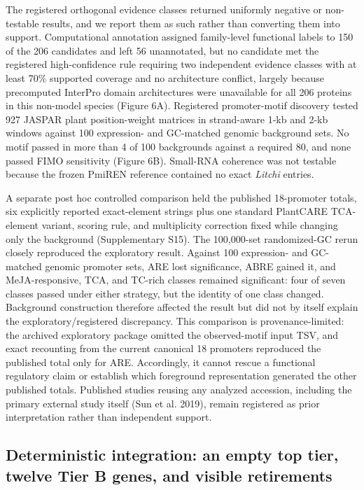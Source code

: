 \documentclass[12pt,letterpaper]{article}
\begin{document}
The registered orthogonal evidence classes returned uniformly negative or non-testable results, and we report them as such rather than converting them into support. Computational annotation assigned family-level functional labels to 150 of the 206 candidates and left 56 unannotated, but no candidate met the registered high-confidence rule requiring two independent evidence classes with at least 70\% supported coverage and no architecture conflict, largely because precomputed InterPro domain architectures were unavailable for all 206 proteins in this non-model species (Figure 6A). Registered promoter-motif discovery tested 927 JASPAR plant position-weight matrices in strand-aware 1-kb and 2-kb windows against 100 expression- and GC-matched genomic background sets. No motif passed in more than 4 of 100 backgrounds against a required 80, and none passed FIMO sensitivity (Figure 6B). Small-RNA coherence was not testable because the frozen PmiREN reference contained no exact \textit{Litchi} entries.

A separate post hoc controlled comparison held the published 18-promoter totals, six explicitly reported exact-element strings plus one standard PlantCARE TCA-element variant, scoring rule, and multiplicity correction fixed while changing only the background (Supplementary S15). The 100,000-set randomized-GC rerun closely reproduced the exploratory result. Against 100 expression- and GC-matched genomic promoter sets, ARE lost significance, ABRE gained it, and MeJA-responsive, TCA, and TC-rich classes remained significant: four of seven classes passed under either strategy, but the identity of one class changed. Background construction therefore affected the result but did not by itself explain the exploratory/registered discrepancy. This comparison is provenance-limited: the archived exploratory package omitted the observed-motif input TSV, and exact recounting from the current canonical 18 promoters reproduced the published total only for ARE. Accordingly, it cannot rescue a functional regulatory claim or establish which foreground representation generated the other published totals. Published studies reusing any analyzed accession, including the primary external study itself (Sun et al. 2019), remain registered as prior interpretation rather than independent support.

\subsection*{Deterministic integration: an empty top tier, twelve Tier B genes, and visible retirements}
\end{document}
